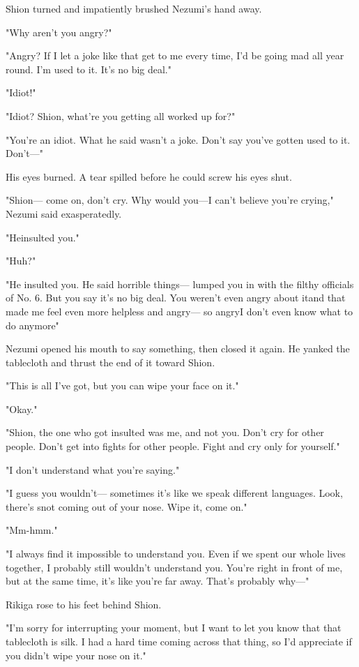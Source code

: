 Shion turned and impatiently brushed Nezumi's hand away.

"Why aren't you angry?"

"Angry? If I let a joke like that get to me every time, I'd be going mad
all year round. I'm used to it. It's no big deal."

"Idiot!"

"Idiot? Shion, what're you getting all worked up for?"

"You're an idiot. What he said wasn't a joke. Don't say you've gotten
used to it. Don't---"

His eyes burned. A tear spilled before he could screw his eyes shut.

"Shion--- come on, don't cry. Why would you\el ---I can't believe you're
crying," Nezumi said exasperatedly.

"He\el insulted you."

"Huh?"

"He insulted you. He said horrible things--- lumped you in with the filthy
officials of No. 6. But you say it's no big deal. You weren't even angry
about it\el and that made me feel even more helpless and angry--- so
angry\el I don't even know what to do anymore\el "

Nezumi opened his mouth to say something, then closed it again. He
yanked the tablecloth and thrust the end of it toward Shion.

"This is all I've got, but you can wipe your face on it."

"Okay."

"Shion, the one who got insulted was me, and not you. Don't cry for
other people. Don't get into fights for other people. Fight and cry only
for yourself."

"I don't understand what you're saying."

"I guess you wouldn't--- sometimes it's like we speak different languages.
Look, there's snot coming out of your nose. Wipe it, come on."

"Mm-hmm."

"I always find it impossible to understand you. Even if we spent our
whole lives together, I probably still wouldn't understand you. You're
right in front of me, but at the same time, it's like you're far away.
That's probably why---"

Rikiga rose to his feet behind Shion.

"I'm sorry for interrupting your moment, but I want to let you know that
that tablecloth is silk. I had a hard time coming across that thing, so
I'd appreciate if you didn't wipe your nose on it."

